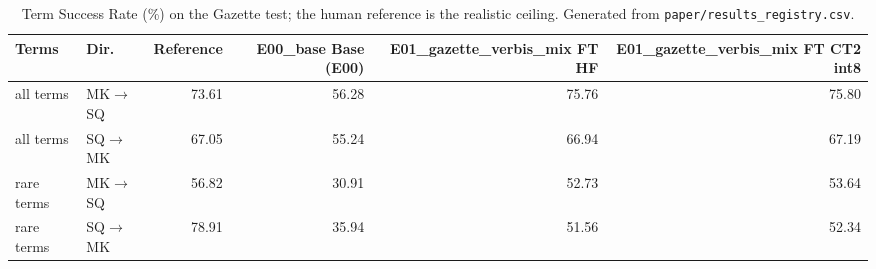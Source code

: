 \begin{table}[t]
\centering
\small
\begin{tabular}{llrrrr}
\toprule
Terms & Dir. & Reference & E00\_base Base (E00) & E01\_gazette\_verbis\_mix FT HF & E01\_gazette\_verbis\_mix FT CT2 int8 \\
\midrule
all terms & MK$\rightarrow$SQ & 73.61 & 56.28 & 75.76 & 75.80 \\
all terms & SQ$\rightarrow$MK & 67.05 & 55.24 & 66.94 & 67.19 \\
rare terms & MK$\rightarrow$SQ & 56.82 & 30.91 & 52.73 & 53.64 \\
rare terms & SQ$\rightarrow$MK & 78.91 & 35.94 & 51.56 & 52.34 \\
\bottomrule
\end{tabular}
\caption{Term Success Rate (\%) on the Gazette test; the human reference is the realistic ceiling. Generated from \texttt{paper/results\_registry.csv}.}
\label{tab:terminology}
\end{table}

